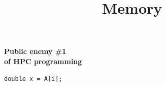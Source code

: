 \documentclass[xcolor={x11names,svgnames}]{beamer}
\title{Memory}
\begin{document}
\begin{frame}[label=title]
    \titlepage
  \end{frame}
  

\begin{frame}[label=golden_rule,fragile]

  \centering
  
    \huge \bf {Public enemy \#1 \\ of HPC programming}

  \vspace{2cm}\pause
\begin{center}
\begin{verbatim}
double x = A[i];
\end{verbatim}
\end{center}
\end{frame}
\end{document}
